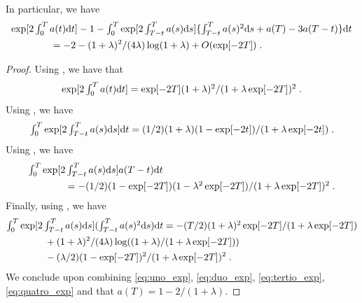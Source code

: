 \begin{proposition}
  In particular, we have
  \begin{align}
    &\textstyle{ \exp[2\int_0^T a(t) \mathrm{d}t] - 1 - \int_0^T\exp[2 \int_{T-t}^T a(s) \mathrm{d}s] \{ \int_{T-t}^T a(s)^2 \mathrm{d}s + a(T) - 3 a(T-t) \} \mathrm{d}t } \\
    & \qquad \qquad =  -2 - (1+\lambda)^2/(4\lambda)\log(1+\lambda) + O(\exp[-2T])  \; . 
  \end{align}
\end{proposition}

\begin{proof}
  Using , we have that
  \begin{equation}
    \textstyle{\exp[2\int_0^T a(t) \mathrm{d}t] = \exp[-2T] (1+\lambda)^2 /(1+ \lambda\exp[-2T])^2 \;. } \label{eq:uno_exp}
  \end{equation}
  Using , we have
  \begin{equation}
    \textstyle{ \int_0^T \exp[2  \int_{T-t}^T a(s) \mathrm{d}s] \mathrm{d}t =  (1/2)(1+\lambda)  (1 -  \exp[-2t])/(1 + \lambda \exp[-2t]) }\; .\label{eq:duo_exp}
  \end{equation}
  Using , we have 
  \begin{align}
    &\textstyle{
      \int_0^T \exp[ 2\int_{T-t}^T a(s) \mathrm{d}s] a(T-t) \mathrm{d}t} \\
    & \qquad \qquad \textstyle{= -(1/2)(1- \exp[-2T])(1 - \lambda^2 \exp[-2T])/(1 + \lambda \exp[-2T])^2 \;. 
      } \label{eq:tertio_exp}
  \end{align}
  Finally, using , we have
  \begin{align}
    &\textstyle{\int_0^T \exp[2\int_{T-t}^T a(s) \mathrm{d}s] (\int_{T-t}^T a(s)^2 \mathrm{d}s) \mathrm{d}t} = - (T/2)(1+\lambda)^2\exp[-2T]/(1+\lambda\exp[-2T]) \\
    & \qquad \qquad + (1+\lambda)^2/(4\lambda)\log((1+\lambda)/(1 + \lambda \exp[-2T])) \\
    & \qquad \qquad -(\lambda/2)(1-\exp[-2T])^2/(1 + \lambda \exp[-2T])^2 \; . \label{eq:quatro_exp}
  \end{align}
  We conclude upon combining \eqref{eq:uno_exp}, \eqref{eq:duo_exp},
  \eqref{eq:tertio_exp}, \eqref{eq:quatro_exp} and that
  $a(T) = 1- 2/(1+\lambda)$.
\end{proof}


